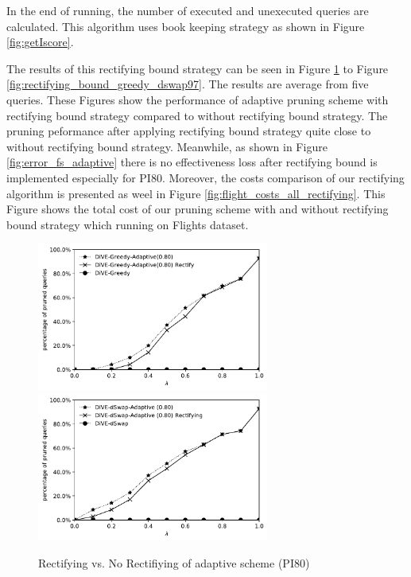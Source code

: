 \documentclass{article}
\begin{document}
In the end of running, the number of executed and unexecuted queries are calculated. This algorithm uses book keeping strategy as shown in Figure  \ref{fig:getIscore}. 

The results of this rectifying bound strategy can be seen in Figure \ref{fig:rectifying_bound_greedy_dswap80} to Figure \ref{fig:rectifying_bound_greedy_dswap97}. The results are average from five queries. These Figures show the performance of adaptive pruning scheme with rectifying bound strategy compared to without rectifying bound strategy. The pruning peformance after applying rectifying bound strategy quite close to without rectifying bound strategy. Meanwhile, as shown in Figure \ref{fig:error_fs_adaptive} there is no effectiveness loss after rectifying bound is implemented especially for PI80. Moreover, the costs comparison of our rectifying algorithm is presented as weel in Figure \ref{fig:flight_costs_all_rectifying}. This Figure shows the total cost of our pruning scheme with and without rectifying bound strategy which running on Flights dataset. 

\begin{figure}
	\begin{center}
		\vspace{-20pt}
		\includegraphics[width=3.0in]{figures/pruning_performance_greedy_adaptive_rectifying_80}
		\includegraphics[width=3.0in]{figures/pruning_performance_dswap_adaptive_rectifying_80}
		\caption{Rectifying vs. No Rectifiying of adaptive scheme (PI80)}
		\label{fig:rectifying_bound_greedy_dswap80}
	\end{center}
\end{figure}
\end{document}
